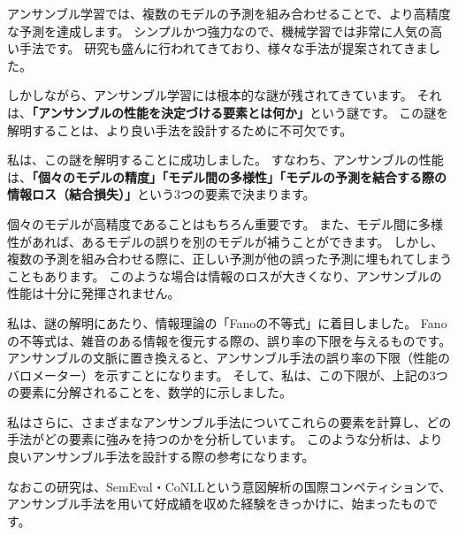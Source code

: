 アンサンブル学習では、複数のモデルの予測を組み合わせることで、より高精度な予測を達成します。
シンプルかつ強力なので、機械学習では非常に人気の高い手法です。
研究も盛んに行われてきており、様々な手法が提案されてきました。

しかしながら、アンサンブル学習には根本的な謎が残されてきています。
それは、\textbf{「アンサンブルの性能を決定づける要素とは何か」}という謎です。
この謎を解明することは、より良い手法を設計するために不可欠です。

私は、この謎を解明することに成功しました。
すなわち、アンサンブルの性能は、\textbf{「個々のモデルの精度」「モデル間の多様性」「モデルの予測を結合する際の情報ロス（結合損失）」}という3つの要素で決まります。

個々のモデルが高精度であることはもちろん重要です。
また、モデル間に多様性があれば、あるモデルの誤りを別のモデルが補うことができます。
しかし、複数の予測を組み合わせる際に、正しい予測が他の誤った予測に埋もれてしまうこともあります。
このような場合は情報のロスが大きくなり、アンサンブルの性能は十分に発揮されません。

私は、謎の解明にあたり、情報理論の「Fanoの不等式」に着目しました。
Fanoの不等式は、雑音のある情報を復元する際の、誤り率の下限を与えるものです。
アンサンブルの文脈に置き換えると、アンサンブル手法の誤り率の下限（性能のバロメーター）を示すことになります。
そして、私は、この下限が、上記の3つの要素に分解されることを、数学的に示しました。

私はさらに、さまざまなアンサンブル手法についてこれらの要素を計算し、どの手法がどの要素に強みを持つのかを分析しています。
このような分析は、より良いアンサンブル手法を設計する際の参考になります。

なおこの研究は、SemEval・CoNLLという意図解析の国際コンペティションで、アンサンブル手法を用いて好成績を収めた経験をきっかけに、始まったものです。
